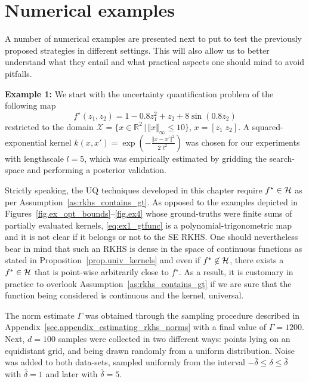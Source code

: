 \section{Numerical examples}

A number of numerical examples are presented next to put to test the previously proposed strategies in different settings. This will also allow us to better understand what they entail and what practical aspects one should mind to avoid pitfalls.

\textbf{Example 1:} We start with the uncertainty quantification problem of the following map
\begin{equation}
	\label{eq:ex1_gtfunc}
	f^\star(z_1,z_2) = 1 - 0.8 z_1^2 + z_2 + 8 \sin(0.8z_2)
\end{equation}
restricted to the domain $\mathcal{X} = \{ x \in \mathbb{R}^2 \, | \, \Vert x \Vert_\infty \leq 10 \}$, $x = [z_1 \; z_2]$. A squared-exponential kernel $k(x,x') = \exp \left(-\frac{\Vert x - x'\Vert^2}{2\ell^2}\right)$ was chosen for our experiments with lengthscale $l=5$, which was empirically estimated by gridding the search-space and performing a posterior validation.

Strictly speaking, the UQ techniques developed in this chapter require $f^\star \in \mathcal{H}$ as per Assumption~\ref{as:rkhs_contains_gt}. As opposed to the examples depicted in Figures~\ref{fig.ex_opt_bounds}--\ref{fig.ex4} whose ground-truths were finite sums of partially evaluated kernels, \eqref{eq:ex1_gtfunc} is a polynomial-trigonometric map and it is not clear if it belongs or not to the SE RKHS. One should nevertheless bear in mind that such an RKHS is dense in the space of continuous functions as stated in Proposition~\ref{prop.univ_kernels} and even if $f^\star \not\in \mathcal{H}$, there exists a $f^* \in \mathcal{H}$ that is point-wise arbitrarily close to $f^\star$. As a result, it is customary in practice to overlook Assumption~\ref{as:rkhs_contains_gt} if we are sure that the function being considered is continuous and the kernel, universal.
 
The norm estimate $\Gamma$ was obtained through the sampling procedure described in Appendix~\ref{sec.appendix_estimating_rkhs_norms} with a final value of $\Gamma=1200$. Next, $d=100$ samples were collected in two different ways: points lying on an equidistant grid, and being drawn randomly from a uniform distribution. Noise was added to both data-sets, sampled uniformly from the interval $-\bar\delta \leq \delta \leq \bar\delta$ with $\bar \delta = 1$ and later with $\bar \delta = 5$.

